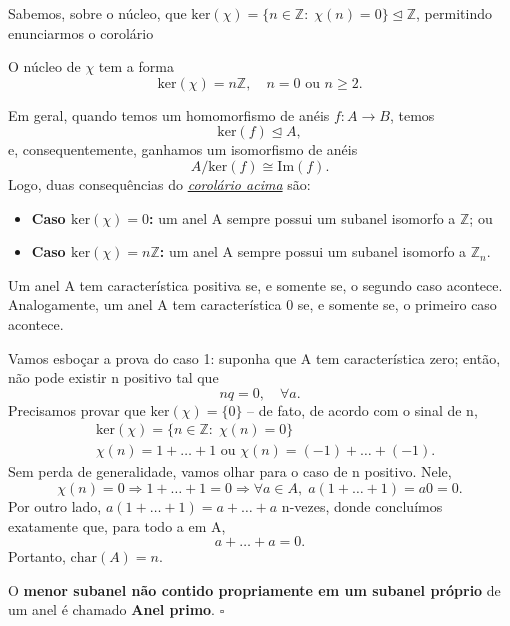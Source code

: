 \documentclass[../algebraIII_notes.tex]{subfiles}
\begin{document}
Sabemos, sobre o núcleo, que \(\mathrm{ker}(\chi )=\{n\in \mathbb{Z}:\; \chi (n)=0\}\trianglelefteq \mathbb{Z}\), permitindo enunciarmos o corolário
\hypertarget{integer_morphism_shape}{\begin{crl*}
		O núcleo de \(\chi \) tem a forma
		\[
			\mathrm{ker}(\chi) = n \mathbb{Z}, \quad n =0 \text{ ou } n\geq 2.
		\]
	\end{crl*}}
Em geral, quando temos um homomorfismo de anéis \(f:A\rightarrow B\), temos
\[
	\mathrm{ker}(f) \trianglelefteq A,
\]
e, consequentemente, ganhamos um isomorfismo de anéis
\[
	A/\mathrm{ker}(f)\cong \mathrm{Im}(f).
\]
Logo, duas consequências do \hyperlink{integer_morphism_shape}{\textit{corolário acima}} são:
\begin{itemize}
	\item \textbf{Caso \(\mathrm{ker}(\chi )=0\):} um anel A sempre possui um subanel isomorfo a \(\mathbb{Z}\); ou
	\item \textbf{Caso \(\mathrm{ker}(\chi )=n\mathbb{Z}\):} um anel A sempre possui um subanel isomorfo a \(\mathbb{Z}_{n}\).
\end{itemize}
\begin{theorem*}
	Um anel A tem característica positiva se, e somente se, o segundo caso acontece. Analogamente, um anel A tem característica 0 se, e somente se, o primeiro caso acontece.
\end{theorem*}
\begin{proof*}[Esboço]
	Vamos esboçar a prova do caso 1: suponha que A tem característica zero; então, não pode existir n positivo tal que
	\[
		n q  =0, \quad \forall a.
	\]
	Precisamos provar que \(\mathrm{ker}(\chi )=\{0\}\) -- de fato, de acordo com o sinal de n,
	\begin{align*}
		 & \mathrm{ker}(\chi )=\{n\in \mathbb{Z}:\; \chi (n)=0\}        \\
		 & \chi (n)=1+\dotsc +1 \text{ ou } \chi (n)=(-1)+\dotsc +(-1).
	\end{align*}
	Sem perda de generalidade, vamos olhar para o caso de n positivo. Nele,
	\[
		\chi (n)=0 \Rightarrow 1+\dotsc +1 = 0 \Rightarrow \forall a\in A,\; a(1+\dotsc +1)=a0=0.
	\]
	Por outro lado, \(a(1+\dotsc +1)=a+\dotsc +a\) n-vezes, donde concluímos exatamente que, para todo a em A,
	\[
		a+\dotsc +a =0.
	\]
	Portanto, \(\mathrm{char}(A)=n\). \qedsymbol
\end{proof*}
\begin{def*}
	O \textbf{menor subanel não contido propriamente em um subanel próprio} de um anel é chamado \textbf{Anel primo}. \(\square\)
\end{def*}
\end{document}
